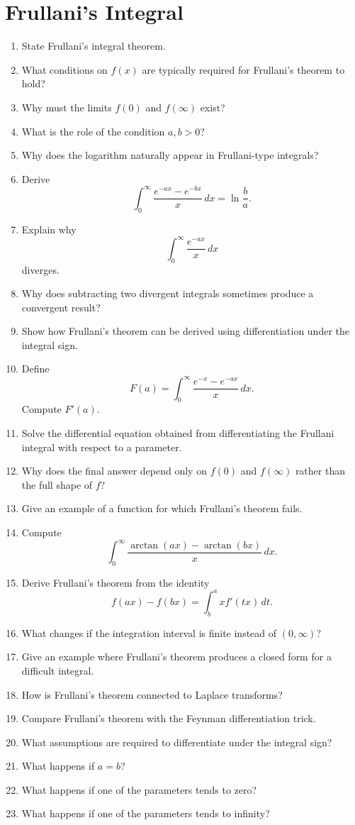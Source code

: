 \section{Frullani's Integral}

\begin{enumerate}
  \item State Frullani's integral theorem.
  \item What conditions on $f(x)$ are typically required for Frullani's theorem to hold?
  \item Why must the limits $f(0)$ and $f(\infty)$ exist?
  \item What is the role of the condition $a,b>0$?
  \item Why does the logarithm naturally appear in Frullani-type integrals?
  \item Derive
    \[
      \int_0^\infty \frac{e^{-ax}-e^{-bx}}{x}\,dx
      =
      \ln\frac{b}{a}.
    \]
  \item Explain why
    \[
      \int_0^\infty \frac{e^{-ax}}{x}\,dx
    \]
    diverges.
  \item Why does subtracting two divergent integrals sometimes produce a convergent result?
  \item Show how Frullani's theorem can be derived using differentiation under the integral sign.
  \item Define
    \[
      F(a)=\int_0^\infty \frac{e^{-x}-e^{-ax}}{x}\,dx.
    \]
    Compute $F'(a)$.
  \item Solve the differential equation obtained from differentiating the Frullani integral with respect to a parameter.
  \item Why does the final answer depend only on $f(0)$ and $f(\infty)$ rather than the full shape of $f$?
  \item Give an example of a function for which Frullani's theorem fails.
  \item Compute
    \[
      \int_0^\infty \frac{\arctan(ax)-\arctan(bx)}{x}\,dx.
    \]
  \item Derive Frullani's theorem from the identity
    \[
      f(ax)-f(bx)
      =
      \int_b^a x f'(tx)\,dt.
    \]
  \item What changes if the integration interval is finite instead of $(0,\infty)$?
  \item Give an example where Frullani's theorem produces a closed form for a difficult integral.
  \item How is Frullani's theorem connected to Laplace transforms?
  \item Compare Frullani's theorem with the Feynman differentiation trick.
  \item What assumptions are required to differentiate under the integral sign?
  \item What happens if $a=b$?
  \item What happens if one of the parameters tends to zero?
  \item What happens if one of the parameters tends to infinity?
\end{enumerate}
